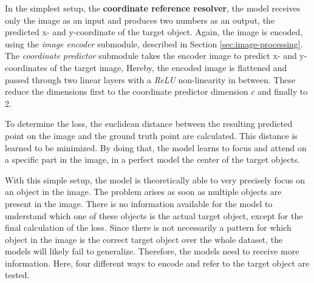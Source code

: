 In the simplest setup, the \textbf{coordinate reference resolver}, the model receives only the image as an input and produces two numbers as an output, the predicted x- and y-coordinate of the target object.
Again, the image is encoded, using the \emph{image encoder} submodule, described in Section \ref{sec:image-processing}.
The \emph{coordinate predictor} submodule takes the encoder image to predict x- and y-coordinates of the target image,
Hereby, the encoded image is flattened and passed through two linear layers with a \emph{ReLU} non-linearity in between.
These reduce the dimensions first to the coordinate predictor dimension $c$ and finally to 2.

To determine the loss, the euclidean distance between the resulting predicted point on the image and the ground truth point are calculated.
This distance is learned to be minimized.
By doing that, the model learns to focus and attend on a specific part in the image, in a perfect model the center of the target objects.

With this simple setup, the model is theoretically able to very precisely focus on an object in the image.
The problem arises as soon as multiple objects are present in the image.
There is no information available for the model to understand which one of these objects is the actual target object, except for the final calculation of the loss.
Since there is not necessarily a pattern for which object in the image is the correct target object over the whole dataset, the models will likely fail to generalize.
Therefore, the models need to receive more information.
Here, four different ways to encode and refer to the target object are tested.

